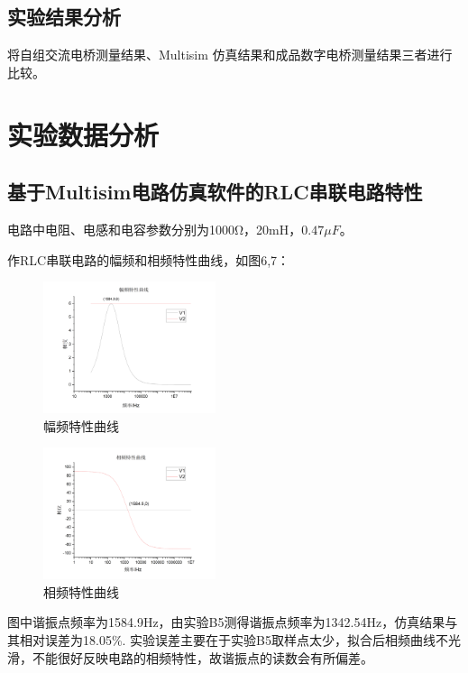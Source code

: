\documentclass[10pt,a4paper,twocolumn,twoside,UTF8]{ctexart}
\begin{document}
    \subsection{实验结果分析}
将自组交流电桥测量结果、Multisim 仿真结果和成品数字电桥测量结果三者进行比较。


\section{实验数据分析}

\subsection{基于Multisim电路仿真软件的RLC串联电路特性}
电路中电阻、电感和电容参数分别为1000Ω，20mH，$0.47\mu F$。

作RLC串联电路的幅频和相频特性曲线，如图6,7：

\begin{figure}[!h]
	\centering
	\includegraphics[width=0.45\textwidth]{img//6a.png}%
	\caption{幅频特性曲线}
	\label{fig:6}
\end{figure}

\begin{figure}
	\centering
	\includegraphics[width=0.45\textwidth]{img//6b.png}%
	\caption{相频特性曲线}
	\label{fig:7}
\end{figure}

图中谐振点频率为1584.9Hz，由实验B5测得谐振点频率为1342.54Hz，仿真结果与其相对误差为18.05\%.
实验误差主要在于实验B5取样点太少，拟合后相频曲线不光滑，不能很好反映电路的相频特性，故谐振点的读数会有所偏差。
\end{document}
